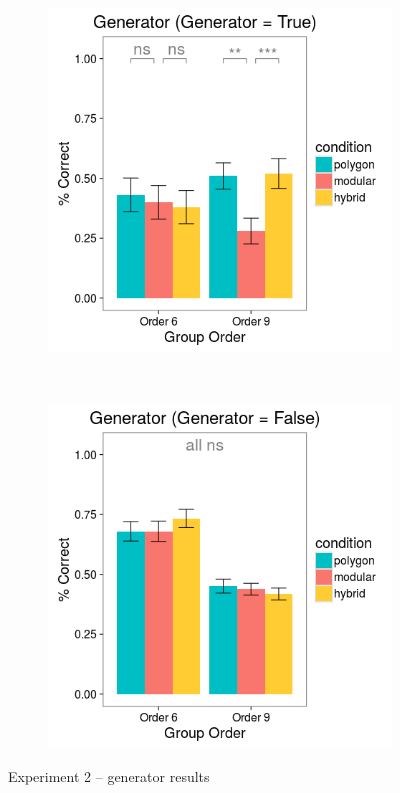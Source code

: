 \documentclass[man,mask,10pt]{apa6}
\begin{document}
\begin{figure}[H]
\centering
\begin{subfigure}[c]{0.3\textwidth}
\centering
\includegraphics[width=\textwidth]{figures/2/gen_T_r.png}
\end{subfigure}
~
\begin{subfigure}[c]{0.3\textwidth}
\centering
\includegraphics[width=\textwidth]{figures/2/gen_F_r.png}
\end{subfigure}
\caption{Experiment 2 -- generator results}
\label{ex2_gen}
\end{figure}\noindent 
\end{document}
